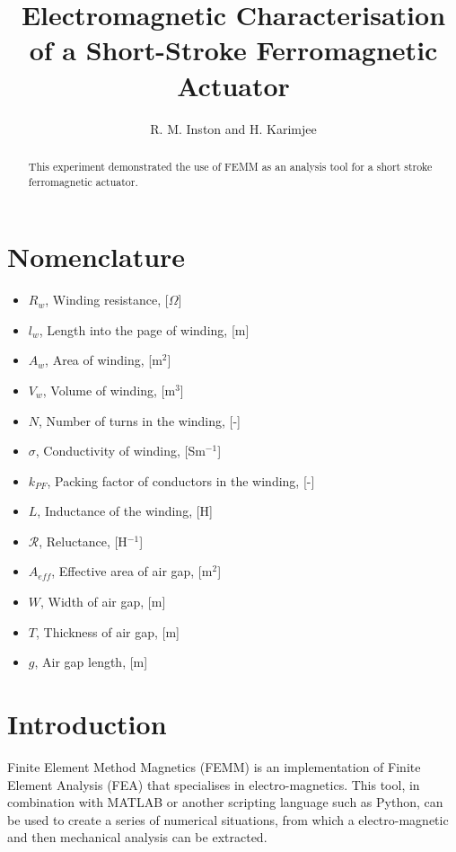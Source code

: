 \documentclass[a4paper]{IEEEtran}
\begin{document}
\title{Electromagnetic Characterisation of a Short-Stroke Ferromagnetic Actuator}
\author{R. M. Inston and H. Karimjee}

\maketitle
\begin{abstract}
This experiment demonstrated the use of FEMM as an analysis tool for a short stroke ferromagnetic actuator. 
\end{abstract}

\section{Nomenclature}
    \begin{itemize}
    \item[]{$R_{w}$, Winding resistance, [$\Omega$]}
    \item[]{$l_{w}$, Length into the page of winding, [m]}
    \item[]{$A_{w}$, Area of winding, [m$^{2}$]}
    \item[]{$V_{w}$, Volume of winding, [m$^{3}$]}
    \item[]{$N$, Number of turns in the winding, [-]}
    \item[]{$\sigma$, Conductivity of winding, [Sm$^{-1}$]}
    \item[]{$k_{PF}$, Packing factor of conductors in the winding, [-]}
    \item[]{$L$, Inductance of the winding, [H]}
    \item[]{$\mathcal{R}$, Reluctance, [H$^{-1}$]}
    \item[]{$A_{eff}$, Effective area of air gap, [m$^{2}$]}
    \item[]{$W$, Width of air gap, [m]}
    \item[]{$T$, Thickness of air gap, [m]}
    \item[]{$g$, Air gap length, [m]}
    \end{itemize}

\section{Introduction}

    Finite Element Method Magnetics (FEMM) is an implementation of Finite Element Analysis (FEA) that specialises in electro-magnetics. This tool, in combination with MATLAB or another scripting language such as Python, can be used to create a series of numerical situations, from which a electro-magnetic and then mechanical analysis can be extracted. 
    
\end{document}
